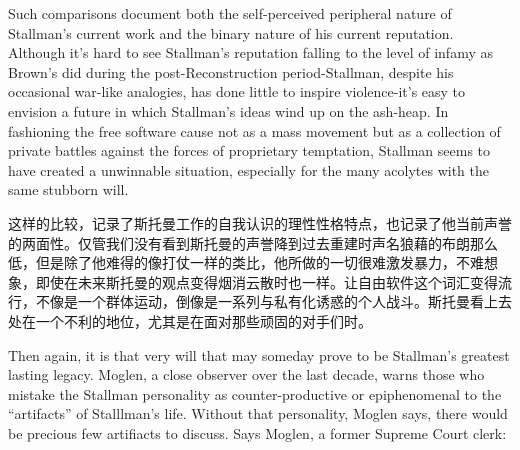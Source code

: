 \ifdefined\eng
Such comparisons document both the self-perceived peripheral nature of Stallman's current work and the binary nature of his current reputation. Although it's hard to see Stallman's reputation falling to the level of infamy as Brown's did during the post-Reconstruction period-Stallman, despite his occasional war-like analogies, has done little to inspire violence-it's easy to envision a future in which Stallman's ideas wind up on the ash-heap. In fashioning the free software cause not as a mass movement but as a collection of private battles against the forces of proprietary temptation, Stallman seems to have created a unwinnable situation, especially for the many acolytes with the same stubborn will.
\fi

\ifdefined\chs
这样的比较，记录了斯托曼工作的自我认识的理性性格特点，也记录了他当前声誉的两面性。仅管我们没有看到斯托曼的声誉降到过去重建时声名狼藉的布朗那么低，但是除了他难得的像打仗一样的类比，他所做的一切很难激发暴力，不难想象，即使在未来斯托曼的观点变得烟消云散时也一样。让自由软件这个词汇变得流行，不像是一个群体运动，倒像是一系列与私有化诱惑的个人战斗。斯托曼看上去处在一个不利的地位，尤其是在面对那些顽固的对手们时。%
\fi

\ifdefined\eng
Then again, it is that very will that may someday prove to be Stallman's greatest lasting legacy. Moglen, a close observer over the last decade, warns those who mistake the Stallman personality as counter-productive or epiphenomenal to the ``artifacts'' of Stalllman's life. Without that personality, Moglen says, there would be precious few artifiacts to discuss. Says Moglen, a former Supreme Court clerk:
\fi

